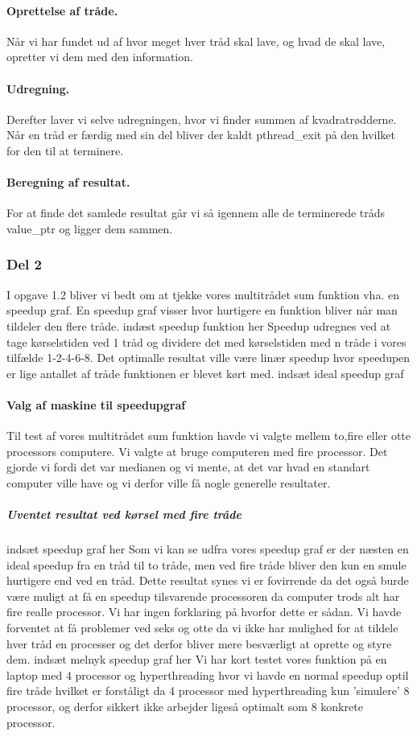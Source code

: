 \paragraph{Oprettelse af tråde.} Når vi har fundet ud af hvor meget hver tråd skal lave, og hvad de skal lave, opretter vi dem med den information.
\paragraph{Udregning.} Derefter laver vi selve udregningen, hvor vi finder summen af kvadratrødderne. Når en tråd er færdig med sin del bliver der kaldt pthread_exit på den hvilket for den til at terminere.
\paragraph{Beregning af resultat.} For at finde det samlede resultat går vi så igennem alle de terminerede tråds value_ptr og ligger dem sammen.

\subsubsection{Del 2}
\label{O1_2}
I opgave 1.2 bliver vi bedt om at tjekke vores multitrådet sum funktion vha. en speedup graf.
En speedup graf visser hvor hurtigere en funktion bliver når man tildeler den flere tråde. 
indæst speedup funktion her\n\n
Speedup udregnes ved at tage kørselstiden ved 1 tråd og dividere det med kørselstiden med n tråde i vores tilfælde 1-2-4-6-8. Det optimalle resultat ville være linær speedup hvor speedupen er lige antallet af tråde funktionen er blevet kørt med.
indsæt ideal speedup graf

\paragraph{Valg af maskine til speedupgraf}
Til test af vores multitrådet sum funktion havde vi valgte mellem to,fire eller otte processors computere. Vi valgte at bruge computeren med fire processor. Det gjorde vi fordi det var medianen og vi mente, at det var hvad en standart computer ville have og vi derfor ville få nogle generelle resultater. 

\subparagraph{Uventet resultat ved kørsel med fire tråde}
indsæt speedup graf her \n\n
Som vi kan se udfra vores speedup graf er der næsten en ideal speedup fra en tråd til to tråde, men ved fire tråde bliver den kun en smule hurtigere end ved en tråd. Dette resultat synes vi er fovirrende da det også burde være muligt at få en speedup tilsvarende processoren da computer trods alt har fire realle processor. Vi har ingen forklaring på hvorfor dette er sådan. 
Vi havde forventet at få problemer ved seks og otte da vi ikke har mulighed for at tildele hver tråd en processer og det derfor bliver mere besværligt at oprette og styre dem. 
indsæt melnyk speedup graf her \n\n
Vi har kort testet vores funktion på en laptop med 4 processor og hyperthreading hvor vi havde en normal speedup optil fire tråde hvilket er forståligt da 4 processor med hyperthreading kun 'simulere' 8 processor, og derfor sikkert ikke arbejder ligeså optimalt som 8 konkrete processor.

